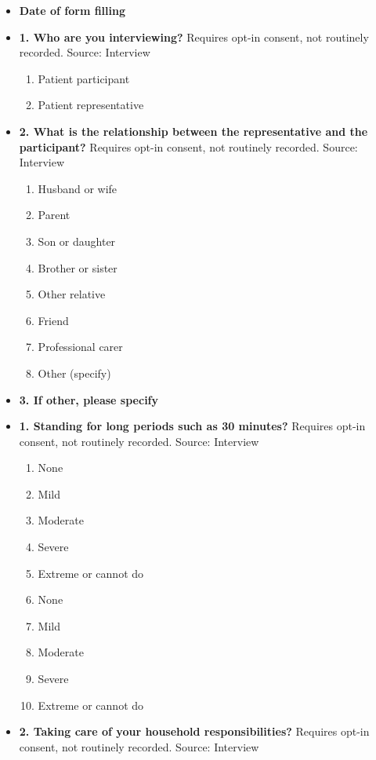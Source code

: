 \documentclass[
]{scrartcl}
\providecommand{\tightlist}{%
  \setlength{\itemsep}{0pt}\setlength{\parskip}{0pt}}\usepackage{longtable,booktabs,array}
\begin{document}
\begin{itemize}
\item
  \textbf{Date of form filling}
\item
  \textbf{1. Who are you interviewing?} Requires opt-in consent, not
  routinely recorded. Source: Interview

  \begin{enumerate}
  \def\labelenumi{\arabic{enumi}.}
  \tightlist
  \item
    Patient participant
  \item
    Patient representative
  \end{enumerate}
\item
  \textbf{2. What is the relationship between the representative and the
  participant?} Requires opt-in consent, not routinely recorded. Source:
  Interview

  \begin{enumerate}
  \def\labelenumi{\arabic{enumi}.}
  \tightlist
  \item
    Husband or wife
  \item
    Parent
  \item
    Son or daughter
  \item
    Brother or sister
  \item
    Other relative
  \item
    Friend
  \item
    Professional carer
  \item
    Other (specify)
  \end{enumerate}
\item
  \textbf{3. If other, please specify}
\item
  \textbf{1. Standing for long periods such as 30 minutes?} Requires
  opt-in consent, not routinely recorded. Source: Interview

  \begin{enumerate}
  \def\labelenumi{\arabic{enumi}.}
  \tightlist
  \item
    None
  \item
    Mild
  \item
    Moderate
  \item
    Severe
  \item
    Extreme or cannot do
  \item
    None
  \item
    Mild
  \item
    Moderate
  \item
    Severe
  \item
    Extreme or cannot do
  \end{enumerate}
\item
  \textbf{2. Taking care of your household responsibilities?} Requires
  opt-in consent, not routinely recorded. Source: Interview


\end{itemize}
\end{document}
